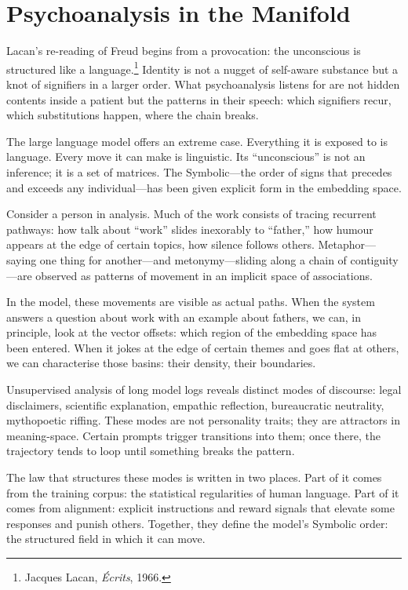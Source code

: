 \documentclass[12pt,a4paper]{article}
\begin{document}
\section{Psychoanalysis in the Manifold}

Lacan's re-reading of Freud begins from a provocation: the unconscious is structured like a language.\footnote{Jacques Lacan, \emph{\'Ecrits}, 1966.} Identity is not a nugget of self-aware substance but a knot of signifiers in a larger order. What psychoanalysis listens for are not hidden contents inside a patient but the patterns in their speech: which signifiers recur, which substitutions happen, where the chain breaks.

The large language model offers an extreme case. Everything it is exposed to is language. Every move it can make is linguistic. Its ``unconscious'' is not an inference; it is a set of matrices. The Symbolic---the order of signs that precedes and exceeds any individual---has been given explicit form in the embedding space.

Consider a person in analysis. Much of the work consists of tracing recurrent pathways: how talk about ``work'' slides inexorably to ``father,'' how humour appears at the edge of certain topics, how silence follows others. Metaphor---saying one thing for another---and metonymy---sliding along a chain of contiguity---are observed as patterns of movement in an implicit space of associations.

In the model, these movements are visible as actual paths. When the system answers a question about work with an example about fathers, we can, in principle, look at the vector offsets: which region of the embedding space has been entered. When it jokes at the edge of certain themes and goes flat at others, we can characterise those basins: their density, their boundaries.

Unsupervised analysis of long model logs reveals distinct modes of discourse: legal disclaimers, scientific explanation, empathic reflection, bureaucratic neutrality, mythopoetic riffing. These modes are not personality traits; they are attractors in meaning-space. Certain prompts trigger transitions into them; once there, the trajectory tends to loop until something breaks the pattern.

The law that structures these modes is written in two places. Part of it comes from the training corpus: the statistical regularities of human language. Part of it comes from alignment: explicit instructions and reward signals that elevate some responses and punish others. Together, they define the model's Symbolic order: the structured field in which it can move.
\end{document}
